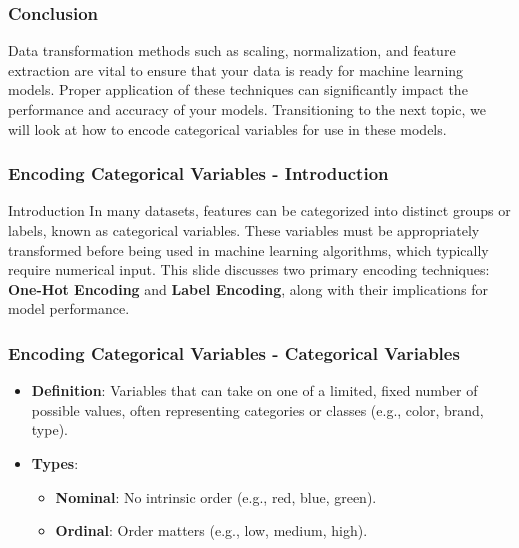 \documentclass{beamer}
\begin{document}
\begin{frame}
    \frametitle{Conclusion}
    Data transformation methods such as scaling, normalization, and feature extraction are vital to ensure that your data is ready for machine learning models. 
    Proper application of these techniques can significantly impact the performance and accuracy of your models. 
    Transitioning to the next topic, we will look at how to encode categorical variables for use in these models.
\end{frame}

\begin{frame}[fragile]
    \frametitle{Encoding Categorical Variables - Introduction}
    \begin{block}{Introduction}
        In many datasets, features can be categorized into distinct groups or labels, known as categorical variables. These variables must be appropriately transformed before being used in machine learning algorithms, which typically require numerical input. This slide discusses two primary encoding techniques: \textbf{One-Hot Encoding} and \textbf{Label Encoding}, along with their implications for model performance.
    \end{block}
\end{frame}

\begin{frame}[fragile]
    \frametitle{Encoding Categorical Variables - Categorical Variables}
    \begin{itemize}
        \item \textbf{Definition}: Variables that can take on one of a limited, fixed number of possible values, often representing categories or classes (e.g., color, brand, type).
        \item \textbf{Types}:
        \begin{itemize}
            \item \textbf{Nominal}: No intrinsic order (e.g., red, blue, green).
            \item \textbf{Ordinal}: Order matters (e.g., low, medium, high).
        \end{itemize}
    \end{itemize}
\end{frame}
\end{document}
